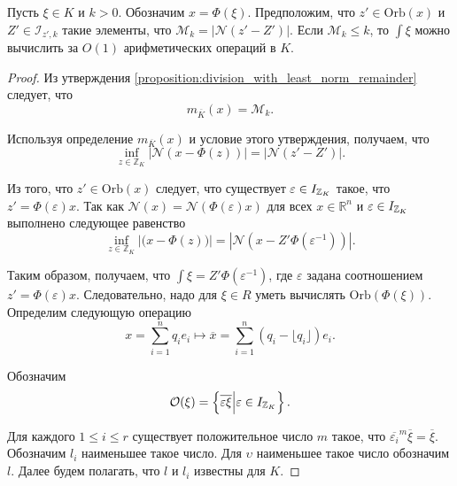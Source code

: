 \documentclass[_00_dissertation.tex]{subfiles}
\begin{document}
\begin{lemma}
    Пусть $\xi \in K$ и $k > 0$.
    Обозначим $x = \Phi(\xi)$.
    Предположим, что $z' \in \textrm{Orb}(x)$ и $Z'\in\mathcal{I}_{z', k}$ такие элементы, что $\mathcal{M}_k = |\mathcal{N}(z'-Z')|$.
    Если $\mathcal{M}_k \le k$, то $\int{\xi}$ можно вычислить за $O(1)$ арифметических операций в $K$.
\end{lemma}
\begin{proof}
    Из утверждения \ref{proposition:division_with_least_norm_remainder} следует, что
    \begin{equation*}
        m_{\overline{K}}(x) = \mathcal{M}_k.
    \end{equation*}
    
    Используя определение $m_{\overline{K}}(x)$ и условие этого утверждения, получаем, что
    \begin{equation*}
        \inf\limits_{z \in \mathbb{Z}_K} |\mathcal{N}(x - \Phi(z))| = |\mathcal{N}(z' - Z')|.
    \end{equation*}

    Из того, что $z' \in \textrm{Orb}(x)$ следует, что существует $\varepsilon \in I_{\mathbb{Z}_K}$ такое, что $z' = \Phi(\varepsilon)x$.
    Так как $\mathcal{N}(x) = \mathcal{N}(\Phi(\varepsilon)x)$ для всех $x \in \mathbb{R}^n$ и $\varepsilon \in I_{\mathbb{Z}_K}$ выполнено следующее равенство
    \begin{equation*}
        \inf\limits_{z \in \mathbb{Z}_K} |\mathcal(x - \Phi(z))| = |\mathcal{N}(x - Z'\Phi(\varepsilon^{-1}))|.
    \end{equation*}

    Таким образом, получаем, что $\int{\xi} = Z'\Phi(\varepsilon^{-1})$, где $\varepsilon$ задана соотношением $z' = \Phi(\varepsilon)x$.
    Следовательно, надо для $\xi \in R$ уметь вычислять $\textrm{Orb}(\Phi(\xi))$.
    Определим следующую операцию
    \begin{equation*}
        x = \sum\limits_{i=1}^n q_i e_i \longmapsto \overline{x} = \sum\limits_{i=1}^n (q_i - \lfloor q_i \rfloor)e_i.
    \end{equation*}
    
    Обозначим
    \begin{equation*}
        \mathcal{O}(\xi) = \left\{
            \overline{\varepsilon\xi} \Big| \varepsilon \in I_{\mathbb{Z}_K}
    	\right\}.
    \end{equation*}
    
    Для каждого $1 \le i \le r$ существует положительное число $m$ такое, что $\overline{\varepsilon_i}^m\overline{\xi} = \overline{\xi}$.
    Обозначим $l_i$ наименьшее такое число.
    Для $\upsilon$ наименьшее такое число обозначим $l$.
    Далее будем полагать, что $l$ и $l_i$ известны для $K$.
    

\end{proof}
\end{document}
